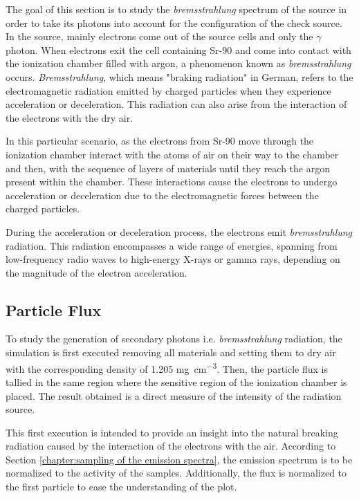 The goal of this section is to study the \textit{bremsstrahlung} spectrum of the source in order to take its photons into account for the configuration of the check source.
In the source, mainly electrons come out of the source cells and only the $\gamma$ photon. When electrons exit the cell containing Sr-90 and come into contact with the ionization chamber filled with argon, a phenomenon known as \emph{bremsstrahlung} occurs. \emph{Bremsstrahlung}, which means "braking radiation" in German, refers to the electromagnetic radiation emitted by charged particles when they experience acceleration or deceleration. This radiation can also arise from the interaction of the electrons with the dry air.

In this particular scenario, as the electrons from Sr-90 move through the ionization chamber interact with the atoms of air on their way to the chamber and then, with the sequence of layers of materials until they reach the argon present within the chamber. These interactions cause the electrons to undergo acceleration or deceleration due to the electromagnetic forces between the charged particles.

During the acceleration or deceleration process, the electrons emit \emph{bremsstrahlung} radiation. This radiation encompasses a wide range of energies, spanning from low-frequency radio waves to high-energy X-rays or gamma rays, depending on the magnitude of the electron acceleration.

\subsection{Particle Flux}

To study the generation of secondary photons i.e. \emph{bremsstrahlung} radiation, the simulation is first executed removing all materials and setting them to dry air with the corresponding density of 1.205 \unit{\milli\gram\per\cubic\centi\meter}. Then, the particle flux is tallied in the same region where the sensitive region of the ionization chamber is placed. The result obtained is a direct measure of the intensity of the radiation source. 

This first execution is intended to provide an insight into the natural breaking radiation caused by the interaction of the electrons with the air. According to Section \ref{chapter:sampling of the emission spectra}, the emission spectrum is to be normalized to the activity of the samples. Additionally, the flux is normalized to the first particle to ease the understanding of the plot. 

